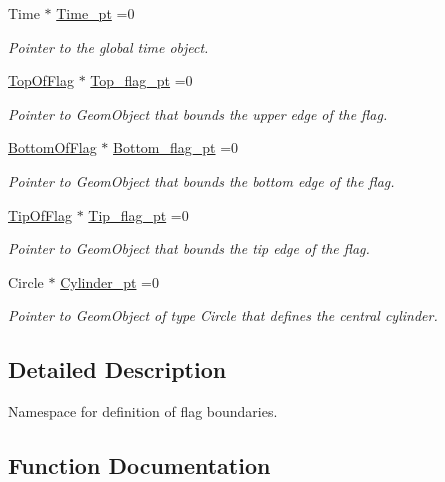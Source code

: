 \begin{DoxyCompactItemize}
Time $\ast$ \hyperlink{namespaceFlag__definition_adc7ca9d539ba8569c5eaa574de22c08f}{Time\+\_\+pt} =0
\begin{DoxyCompactList}\small\item\em Pointer to the global time object. \end{DoxyCompactList}\item 
\hyperlink{classFlag__definition_1_1TopOfFlag}{Top\+Of\+Flag} $\ast$ \hyperlink{namespaceFlag__definition_af602ebeb0c40d05d00961af07bf3e842}{Top\+\_\+flag\+\_\+pt} =0
\begin{DoxyCompactList}\small\item\em Pointer to Geom\+Object that bounds the upper edge of the flag. \end{DoxyCompactList}\item 
\hyperlink{classFlag__definition_1_1BottomOfFlag}{Bottom\+Of\+Flag} $\ast$ \hyperlink{namespaceFlag__definition_adde5e58da47e90ef46e1183188281f2e}{Bottom\+\_\+flag\+\_\+pt} =0
\begin{DoxyCompactList}\small\item\em Pointer to Geom\+Object that bounds the bottom edge of the flag. \end{DoxyCompactList}\item 
\hyperlink{classFlag__definition_1_1TipOfFlag}{Tip\+Of\+Flag} $\ast$ \hyperlink{namespaceFlag__definition_a17de6efd8447ee9c2bb5a1767084ecef}{Tip\+\_\+flag\+\_\+pt} =0
\begin{DoxyCompactList}\small\item\em Pointer to Geom\+Object that bounds the tip edge of the flag. \end{DoxyCompactList}\item 
Circle $\ast$ \hyperlink{namespaceFlag__definition_a87051411606f6aa4518ace9ce66a4189}{Cylinder\+\_\+pt} =0
\begin{DoxyCompactList}\small\item\em Pointer to Geom\+Object of type Circle that defines the central cylinder. \end{DoxyCompactList}\end{DoxyCompactItemize}


\subsection{Detailed Description}
Namespace for definition of flag boundaries. 

\subsection{Function Documentation}
\mbox{\label{namespaceFlag__definition_a91eabcfac65c509ab3448d82db1eb988}} 
